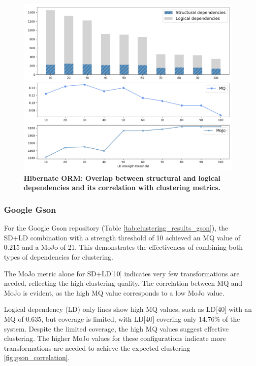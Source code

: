 \documentclass{ieeeaccess}
\begin{document}
\begin{figure}[t!]
  \centering
  \includegraphics[width=\columnwidth]{hibernate_correlation.png}
  \caption{\textbf{Hibernate ORM: Overlap between structural and logical dependencies and its correlation with clustering metrics.}}
  \label{fig:hibernate_correlation}
\end{figure}

\subsubsection{Google Gson}

For the Google Gson repository (Table \ref{tab:clustering_results_gson}), the SD+LD combination with a strength threshold of 10 achieved an MQ value of 0.215 and a MoJo of 21. This demonstrates the effectiveness of combining both types of dependencies for clustering.

The MoJo metric alone for SD+LD[10] indicates very few transformations are needed, reflecting the high clustering quality. The correlation between MQ and MoJo is evident, as the high MQ value corresponds to a low MoJo value.

Logical dependency (LD) only lines show high MQ values, such as LD[40] with an MQ of 0.635, but coverage is limited, with LD[40] covering only 14.76\% of the system. Despite the limited coverage, the high MQ values suggest effective clustering. The higher MoJo values for these configurations indicate more transformations are needed to achieve the expected clustering  \ref{fig:gson_correlation}.
\end{document}
